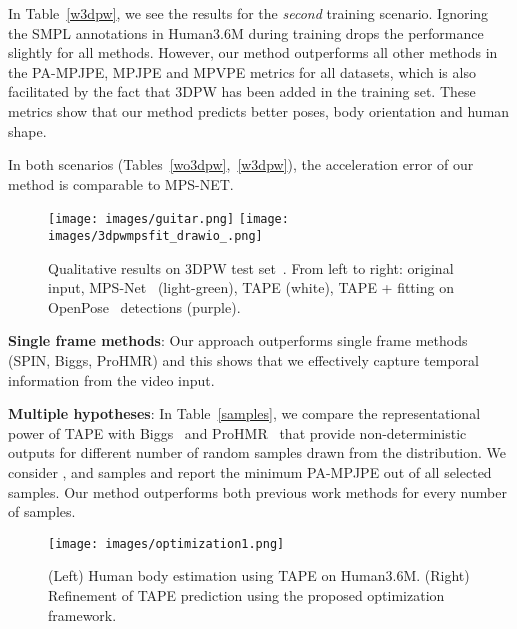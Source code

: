 \documentclass[runningheads]{llncs}
\begin{document}
 In Table~\ref{w3dpw}, we see the results for the \textit{second} training scenario. Ignoring the SMPL annotations in Human3.6M during training drops the performance slightly for all methods. However, our method outperforms all other methods in the PA-MPJPE, MPJPE and MPVPE metrics for all datasets, which is also facilitated by the fact that 3DPW has been added in the training set. These metrics show that our method predicts better poses, body orientation and human shape. 

In both scenarios (Tables~\ref{wo3dpw},~\ref{w3dpw}), the acceleration error of our method is comparable to MPS-NET.

\begin{figure}[t]
    \centering
    \texttt{[image: images/guitar.png]}
        \texttt{[image: images/3dpwmpsfit\_drawio\_.png]}
    \caption{Qualitative results on 3DPW test set~\cite{vonMarcard2018}. From left to right: original input, MPS-Net~\cite{WeiLin2022mpsnet} (light-green), TAPE (white), TAPE + fitting on OpenPose~\cite{wei2016cpm} detections (purple).}
    \label{fig:my_label2}
\end{figure}

\vspace*{0.1cm}\noindent\textbf{Single frame methods}:
Our approach outperforms single frame methods (SPIN, Biggs, ProHMR) and this shows that we effectively capture temporal information from the video input.


\vspace*{0.1cm}\noindent\textbf{Multiple hypotheses}:
In Table~\ref{samples}, we compare the representational power of TAPE with Biggs~\cite{biggs2020multibodies} and ProHMR~\cite{kolotouros2021prohmr} that provide non-deterministic outputs for different number of random samples drawn from the distribution. We consider ,  and  samples and report the minimum PA-MPJPE out of all selected samples. Our method outperforms both previous work methods for every number of samples.

\begin{figure}[t]
    \centering
    \texttt{[image: images/optimization1.png]}
    \caption{(Left) Human body estimation using TAPE on Human3.6M. (Right) Refinement of TAPE prediction using the proposed optimization framework.}
    \label{opt}
\end{figure}
\end{document}
